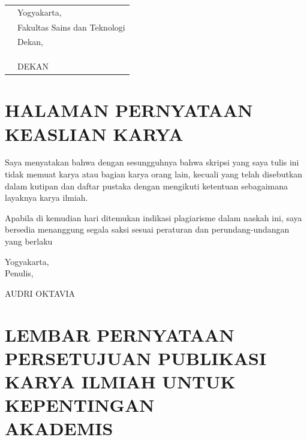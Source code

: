 \documentclass[oneside, 12pt, a4paper]{book}
\def\author{AUDRI OKTAVIA}
\def\dekan{DEKAN}
\numberwithin{equation}{chapter}
\numberwithin{algorithm}{chapter}
\begin{document}
\begin{center}
	\vspace{2cm}
	
	\begin{tabularx}{\textwidth}{
		>{\raggedright\arraybackslash}X
		>{\raggedleft\arraybackslash}m{10cm}
		}
		& Yogyakarta, \makebox[3cm]{\dotfill} \\
		& Fakultas Sains dan Teknologi \\
		& Dekan,\\
		&\\
		&\\
		&\\
		& \dekan
	\end{tabularx}
\end{center}


\clearpage
\chapter{HALAMAN PERNYATAAN KEASLIAN KARYA}
\begin{doublespace}
	Saya menyatakan bahwa dengan sesungguhnya bahwa skripsi yang saya tulis ini tidak memuat karya atau bagian karya orang lain, kecuali yang telah disebutkan dalam kutipan dan daftar pustaka dengan mengikuti ketentuan sebagaimana layaknya karya ilmiah.
	
	Apabila di kemudian hari ditemukan indikasi plagiarisme dalam naskah ini, saya bersedia menanggung segala saksi sesuai peraturan dan perundang-undangan yang berlaku
	
	\vspace{1cm}
	
	\begin{flushright}
		Yogyakarta, \makebox[3cm]{\dotfill}\\ [-0.2ex]
		Penulis,

		\vspace{1cm}

		\author
	\end{flushright}
\end{doublespace}


\clearpage
\chapter[LEMBAR PERNYATAAN PERSETUJUAN PUBLIKASI]{LEMBAR PERNYATAAN PERSETUJUAN PUBLIKASI\\KARYA ILMIAH UNTUK KEPENTINGAN\\AKADEMIS}
\end{document}
